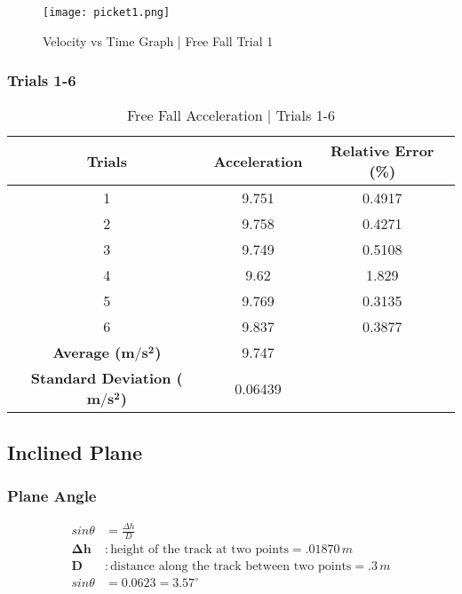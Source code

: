 \begin{figure}
	\begin{center}
		\texttt{[image: picket1.png]}
	\end{center}
	\caption{Velocity vs Time Graph | Free Fall Trial 1}
	\label{fig: picketg1}
\end{figure} 


\subsubsection{Trials 1-6}

\begin{table}[H]
\centering
\begin{tabular}{@{}ccc@{}}
\toprule
\textbf{Trials} & \textbf{Acceleration} & \textbf{Relative Error (\%)} \\ \midrule
1 & 9.751 & 0.4917 \\
2 & 9.758 & 0.4271 \\
3 & 9.749 & 0.5108 \\
4 & 9.62 & 1.829 \\
5 & 9.769 & 0.3135 \\
6 & 9.837 & 0.3877 \\ \midrule
\textbf{Average ($\boldsymbol{m/s^2}$)} & 9.747 &  \\
\textbf{Standard Deviation ($\boldsymbol{m/s^2}$)} & 0.06439 &  \\ \bottomrule
\end{tabular}
\caption{Free Fall Acceleration | Trials 1-6}
\label{tab:ff-ta}
\end{table}

\subsection{Inclined Plane}


	\subsubsection{Plane Angle}
	\begin{align*}
		sin\theta &= \frac{\Delta h}{D} \\
		\boldsymbol{\Delta h} &: \text{height of the track at two points} = \boxed{.01870\,m} \\
		\textbf{D} &: \text{distance along the track between two points} = \boxed{.3\,m} \\
		sin\theta &= 0.0623 = \boxed{3.57^\circ}
	\end{align*}

